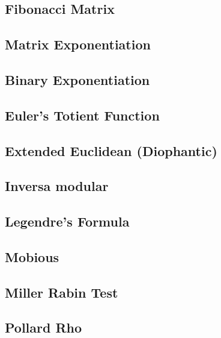\subsection{Fibonacci Matrix}
\raggedbottom
\hrulefill
\subsection{Matrix Exponentiation}
\raggedbottom
\hrulefill
\subsection{Binary Exponentiation}
\raggedbottom
\hrulefill
\subsection{Euler's Totient Function}
\raggedbottom
\hrulefill
\subsection{Extended Euclidean (Diophantic)}
\raggedbottom
\hrulefill
\subsection{Inversa modular}
\raggedbottom
\hrulefill
\subsection{Legendre's Formula}
\raggedbottom
\hrulefill
\subsection{Mobious}
\raggedbottom
\hrulefill
\subsection{Miller Rabin Test}
\raggedbottom
\hrulefill
\subsection{Pollard Rho}
\raggedbottom
\hrulefill
